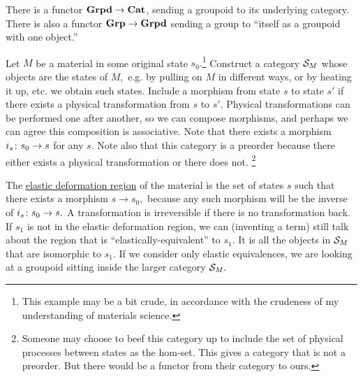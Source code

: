 \documentclass[../main/CT4S-EN-RU]{subfiles}
\begin{document}
\begin{definitionRUS}
\end{definitionRUS}

\begin{exampleENG}
There is a functor ${\mathbf{Grpd}}\rightarrow{\mathbf{Cat}}$, sending a groupoid to its underlying category. There is also a functor ${\mathbf{Grp}}\rightarrow{\mathbf{Grpd}}$ sending a group to “itself as a groupoid with one object.” 
\end{exampleENG}

\begin{exampleRUS}
\end{exampleRUS}

\begin{applicationENG}
Let $M$ be a material in some original state $s_0.$\footnote{This example may be a bit crude, in accordance with the crudeness of my understanding of materials science.} Construct a category $\mathcal{S}_M$ whose objects are the states of $M,$ e.g. by pulling on $M$ in different ways, or by heating it up, etc. we obtain such states. Include a morphism from state $s$ to state $s'$ if there exists a physical transformation from $s$ to $s'.$ Physical transformations can be performed one after another, so we can compose morphisms, and perhaps we can agree this composition is associative. Note that there exists a morphism $i_s\colon s_0\rightarrow s$ for any $s.$ Note also that this category is a preorder because there either exists a physical transformation or there does not. 
\footnote{Someone may choose to beef this category up to include the set of physical processes between states as the hom-set. This gives a category that is not a preorder. But there would be a functor from their category to ours.}

The \href{http://en.wikipedia.org/wiki/Elastic_modulus}{\text elastic deformation region} of the material is the set of states $s$ such that there exists a morphism $s\to s_0,$ because any such morphism will be the inverse of $i_s\colon s_0\rightarrow s.$ A transformation is irreversible if there is no transformation back. If $s_1$ is not in the elastic deformation region, we can (inventing a term) still talk about the region that is “elastically-equivalent” to $s_1.$ It is all the objects in $\mathcal{S}_M$ that are isomorphic to $s_1.$ If we consider only elastic equivalences, we are looking at a groupoid sitting inside the larger category $\mathcal{S}_M.$
\end{applicationENG}
\end{document}
